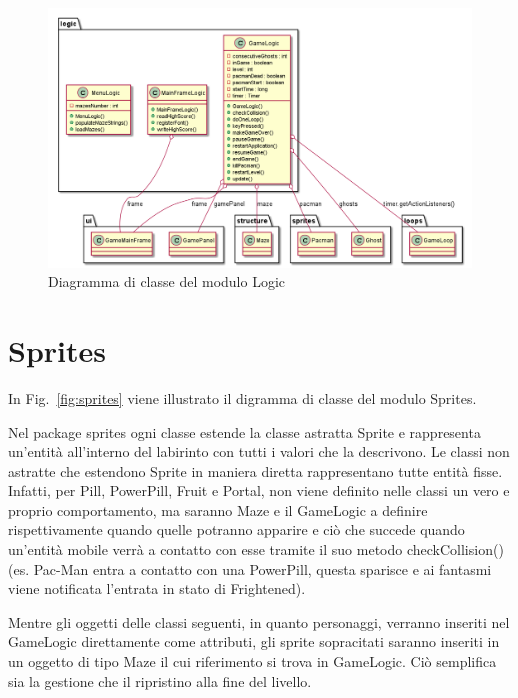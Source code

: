 \documentclass[12pt,a4paper]{report}
\begin{document}
\begin{figure}[tb]
\begin{center}
  \includegraphics[width=13cm]{logic}
\end{center}
  \caption{Diagramma di classe del modulo Logic}
  \label{fig:logic}
\end{figure}


\section{Sprites}\label{se:arch.sprites}
In Fig.~\ref{fig:sprites} viene illustrato il digramma di classe del modulo Sprites.\newline

Nel package sprites ogni classe estende la classe astratta Sprite e rappresenta un’entità all’interno del labirinto con tutti i valori che la descrivono. Le classi non astratte che estendono Sprite in maniera diretta rappresentano tutte entità fisse. Infatti, per Pill, PowerPill, Fruit e Portal, non viene definito nelle classi un vero e proprio comportamento, ma saranno Maze e il GameLogic a definire rispettivamente quando quelle potranno apparire e ciò che succede quando un’entità mobile verrà a contatto con esse tramite il suo metodo checkCollision() (es. Pac-Man entra a contatto con una PowerPill, questa sparisce e ai fantasmi viene notificata l’entrata in stato di Frightened).

Mentre gli oggetti delle classi seguenti, in quanto personaggi, verranno inseriti nel GameLogic direttamente come attributi, gli sprite sopracitati saranno inseriti in un oggetto di tipo Maze il cui riferimento si trova in GameLogic. Ciò semplifica sia la gestione che il ripristino alla fine del livello.
\end{document}
